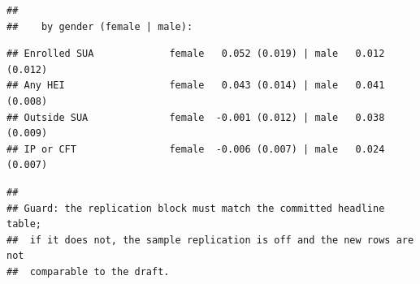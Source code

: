 \documentclass[
]{article}
\begin{document}
\begin{verbatim}
## 
##    by gender (female | male):
\end{verbatim}

\begin{verbatim}
## Enrolled SUA             female   0.052 (0.019) | male   0.012 (0.012)
## Any HEI                  female   0.043 (0.014) | male   0.041 (0.008)
## Outside SUA              female  -0.001 (0.012) | male   0.038 (0.009)
## IP or CFT                female  -0.006 (0.007) | male   0.024 (0.007)
\end{verbatim}

\begin{verbatim}
## 
## Guard: the replication block must match the committed headline table;
##  if it does not, the sample replication is off and the new rows are not
##  comparable to the draft.
\end{verbatim}
\end{document}
